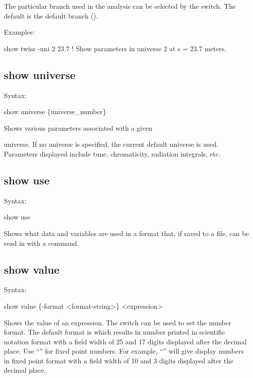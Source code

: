 {{{{{{{{{The particular branch used in the analysis can be selected by the  switch. The
default is the default branch ().

Examples:
\begin{example}
  show twiss -uni 2 23.7     ! Show parameters in universe 2 at s = 23.7 meters.
\end{example} 


\subsection{show universe}
\label{s:show.universe}

Syntax:
\begin{example}
  show universe \{universe_number\}
\end{example}

Shows various parameters associated with a given

universe. If no universe is specified, the current default universe is used. Parameters displayed
include tune, chromaticity, radiation integrals, etc.


\subsection{show use}
\label{s:show.use}

Syntax:
\begin{example}
  show use
\end{example}

Shows what data and variables are used in a format that, if saved to a file, can be read
in with a  command.


\subsection{show value}
\label{s:show.value}

Syntax:
\begin{example}
  show value \{-format <format-string>\} <expression>
\end{example}

Shows the value of an expression. The  switch can be used to set the number format.
The default format is  which results in number printed in scientific notation format
with a field width of 25 and 17 digits displayed after the decimal place. Use ``'' for fixed
point numbers. For example, ``'' will give display numbers in fixed point format with a
field width of 10 and 3 digits displayed after the decimal place.

}}}}}}}}}
